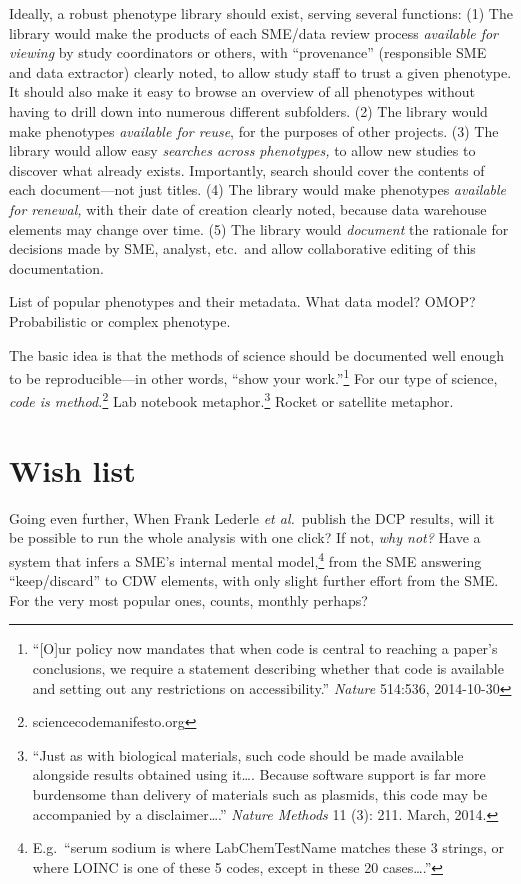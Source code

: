 \documentclass{tufte-handout}
\begin{document}
Ideally, a robust phenotype library should exist, serving several
functions: (1) The library would make the products of each SME/data
review process \emph{available for viewing} by study coordinators or
others, with ``provenance'' (responsible SME and data extractor)
clearly noted, to allow study staff to trust a given phenotype. It
should also make it easy to browse an overview of all phenotypes
without having to drill down into numerous different subfolders. (2)
The library would make phenotypes \emph{available for reuse}, for the
purposes of other projects. (3) The library would allow easy
\emph{searches across phenotypes,} to allow new studies to discover
what already exists. Importantly, search should cover the contents of
each document---not just titles. (4) The library would make phenotypes
\emph{available for renewal,} with their date of creation clearly
noted, because data warehouse elements may change over time. (5) The
library would \emph{document} the rationale for decisions made by SME,
analyst, etc.\ and allow collaborative editing of this documentation.



List of popular phenotypes and their metadata.  What data model? OMOP?
Probabilistic or complex phenotype.


The basic idea is that the methods of science should be documented
well enough to be reproducible---in other words, ``show your
work.''\footnote{``[O]ur policy now mandates that when code is central
  to reaching a paper's conclusions, we require a statement describing
  whether that code is available and setting out any restrictions on
  accessibility.'' \emph{Nature} 514:536, 2014-10-30} For our type of
science, \emph{code is method.}\footnote{sciencecodemanifesto.org} Lab
notebook metaphor.\footnote{``Just as with biological materials, such
  code should be made available alongside results obtained using
  it\ldots{}. Because software support is far more burdensome than
  delivery of materials such as plasmids, this code may be accompanied
  by a disclaimer\ldots{}.'' \emph{Nature Methods} 11 (3): 211. March,
  2014.} Rocket or satellite metaphor.

\section{Wish list}

Going even further, When Frank Lederle \emph{et al.}\ publish the DCP
results, will it be possible to run the whole analysis with one click?
If not, \emph{why not?} Have a system that infers a SME's internal
mental model,\footnote{E.g.\ ``serum sodium is where LabChemTestName
  matches these 3 strings, or where LOINC is one of these 5 codes,
  except in these 20 cases\ldots{}.''} from the SME answering
``keep/discard'' to CDW elements, with only slight further effort from
the SME. For the very most popular ones, counts, monthly perhaps?
\end{document}
